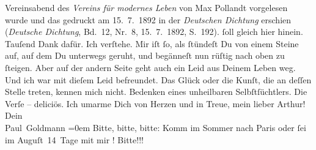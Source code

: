 \begin{ledgroupsized}[t]{13cm}
{{{                  Vereinsabend des \emph{Vereins für modernes Leben}
                  von Max Pollandt vorgelesen wurde und das
                  gedruckt am 15. 7. 1892 in der \emph{Deutschen Dichtung} erschien (\emph{Deutsche Dichtung}, Bd. 12, Nr. 8,
                        15. 7. 1892, S. 192).}}}\label{K_L02697-1h} ſoll gleich hier hinein.
               Tauſend Dank dafür. Ich verſtehe. Mir iſt ſo, als ſtündeſt Du von einem Steine auf,
               auf dem Du unterwegs geruht, und begänneſt nun rüſtig nach oben zu ſteigen. Aber auf
               der andern Seite geht auch ein  Leid aus Deinem
               Leben weg. Und ich war mit dieſem Leid befreundet. Das Glück oder die Kunſt, die an
               deſſen Stelle treten, kennen mich nicht. Bedenken eines unheilbaren
               Selbſtſüchtlers.\pend
           \pstart
           Die Verſe – deliciös.\pend
           \pstart
           Ich umarme Dich von Herzen und in Treue, mein lieber Arthur!\pend
           \pstart
           Dein {\\[\baselineskip]}\spacefill\mbox{Paul Goldmann}\pend
           \leftskip=0em{}\pstart
           \noindent{}{\pb}Bitte, bitte, bitte: Komm im Sommer nach Paris oder ſei im Auguſt 14 Tage mit mir \label{K_L02697-2v}\label{K_L02697-2h}! Bitte!!!\pend
           
         
         \endnumbering{}\end{ledgroupsized}  \newcommand{\dateiname}{L02697}\newcommand{\titel}{Paul Goldmann an Arthur Schnitzler, 23. 4. [1892]}\newcommand{\editorInnen}{Martin Anton Müller und Laura Untner}
      